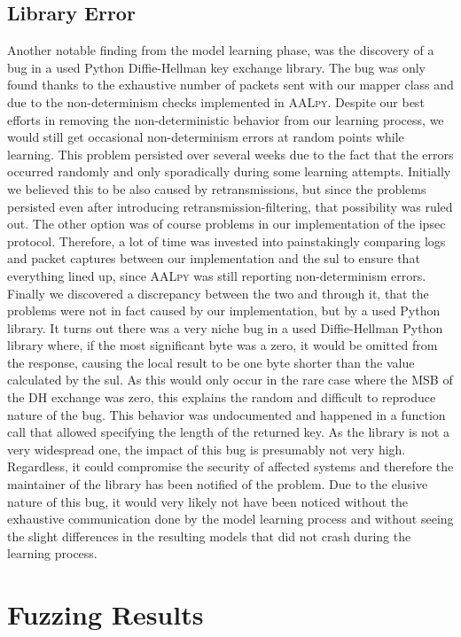 \subsection{Library Error} \label{subsec:liberror}
Another notable finding from the model learning phase, was the discovery of a bug in a used Python Diffie-Hellman key exchange library. The bug was only found thanks to the exhaustive number of packets sent with our mapper class and due to the non-determinism checks implemented in \textsc{AALpy}. Despite our best efforts in removing the non-deterministic behavior from our learning process, we would still get occasional non-determinism errors at random points while learning. This problem persisted over several weeks due to the fact that the errors occurred randomly and only sporadically during some learning attempts. Initially we believed this to be also caused by retransmissions, but since the problems persisted even after introducing retransmission-filtering, that possibility was ruled out. The other option was of course problems in our implementation of the \ac{ipsec} protocol. Therefore, a lot of time was invested into painstakingly comparing logs and packet captures between our implementation and the \ac{sul} to ensure that everything lined up, since \textsc{AALpy} was still reporting non-determinism errors. Finally we discovered a discrepancy between the two and through it, that the problems were not in fact caused by our implementation, but by a used Python library. It turns out there was a very niche bug in a used Diffie-Hellman Python library where, if the most significant byte was a zero, it would be omitted from the response, causing the local result to be one byte shorter than the value calculated by the \ac{sul}. As this would only occur in the rare case where the MSB of the DH exchange was zero, this explains the random and difficult to reproduce nature of the bug. This behavior was undocumented and happened in a function call that allowed specifying the length of the returned key. As the library is not a very widespread one, the impact of this bug is presumably not very high. Regardless, it could compromise the security of affected systems and therefore the maintainer of the library has been notified of the problem. Due to the elusive nature of this bug, it would very likely not have been noticed without the exhaustive communication done by the model learning process and without seeing the slight differences in the resulting models that did not crash during the learning process.

\section{Fuzzing Results} \label{subsec:fuzzresults}
